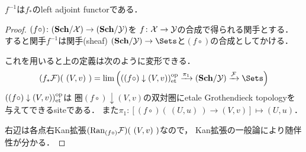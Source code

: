 \begin{Prop}[\cite{SP} 00XF]
    $f^{-1}$は$f_*$のleft adjoint functorである．
\end{Prop}
\begin{proof}
    $(f \circ) \colon (\mathbf{Sch}/\mathcal{X}) \to (\mathbf{Sch}/\mathcal{Y})$を
    $f \colon \mathcal{X} \to \mathcal{Y}$の合成で得られる関手とする．
    すると関手$f^{-1}$は関手(sheaf) $(\Sch/\stY) \to \Sets$と$(f \circ)$の合成としてかける．

    これを用いると上の定義は次のように変形できる．
    \[
        (f_*\shF)(\ (V,v)\ )
        =\Lim\Big(  ((f \circ) \downarrow (V,v))_{\et}^{\mathrm{op}} \xto{\pi_1} (\Sch/\stY) \xto{\shF} \Sets \Big)
    \]
    $((f \circ) \downarrow (V,v))_{\mathrm{et}}^{\mathrm{op}}$は
    圏$(f \circ) \downarrow (V,v)$の双対圏にetale Grothendieck topologyを与えてできるsiteである．
    また$\pi_1 \colon [(f \circ)(\ (U,u)\ ) \to (V,v)] \mapsto (U,u)$．
    
    右辺は各点右Kan拡張$(\mathrm{Ran}_{(f \circ)} \mathcal{F})(\ (V,v)\ )$なので，
    Kan拡張の一般論により随伴性が分かる．
\end{proof}

